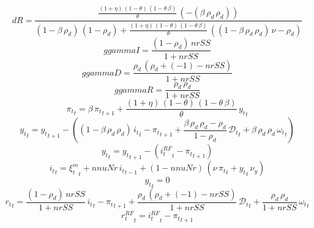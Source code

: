 \begin{dmath*}
dR = \frac{\frac{\left(1+{\eta}\right)\, \left(1-{\theta}\right)\, \left(1-{\theta}\, {\beta}\right)}{{\theta}}\, \left(-\left({\beta}\, {\rho_d}\, {\rho_d}\right)\right)}{\left(1-{\beta}\, {\rho_d}\right)\, \left(1-{\rho_d}\right)+\frac{\left(1+{\eta}\right)\, \left(1-{\theta}\right)\, \left(1-{\theta}\, {\beta}\right)}{{\theta}}\, \left(\left(1-{\beta}\, {\rho_d}\, {\rho_d}\right)\, {\nu}-{\rho_d}\right)}
\end{dmath*}
\begin{dmath*}
ggammaI = \frac{\left(1-{\rho_d}\right)\, {nrSS}}{1+{nrSS}}
\end{dmath*}
\begin{dmath*}
ggammaD = \frac{{\rho_d}\, \left({\rho_d}+\left(-1\right)-{nrSS}\right)}{1+{nrSS}}
\end{dmath*}
\begin{dmath*}
ggammaR = \frac{{\rho_d}\, {\rho_d}}{1+{nrSS}}
\end{dmath*}
\begin{dmath}
{\pi_t}_{t}={\beta}\, {\pi_t}_{t+1}+\frac{\left(1+{\eta}\right)\, \left(1-{\theta}\right)\, \left(1-{\theta}\, {\beta}\right)}{{\theta}}\, {y_t}_{t}
\end{dmath}
\begin{dmath}
{y_t}_{t}={y_t}_{t+1}-\left(\left(1-{\beta}\, {\rho_d}\, {\rho_d}\right)\, {i_t}_{t}-{\pi_t}_{t+1}+\frac{{\beta}\, {\rho_d}\, {\rho_d}-{\rho_d}}{1-{\rho_d}}\, {\mathcal{D}_t}_{t}+{\beta}\, {\rho_d}\, {\rho_d}\, {\omega_t}_{t}\right)
\end{dmath}
\begin{dmath}
{y_t}_{t}={y_t}_{t+1}-\left({i^{RF}_t}_{t}-{\pi_t}_{t+1}\right)
\end{dmath}
\begin{dmath}
{i_t}_{t}={\xi^m_t}_{t}+{nnuNr}\, {i_t}_{t-1}+\left(1-{nnuNr}\right)\, \left({\nu}\, {\pi_t}_{t}+{y_t}_{t}\, {\nu_y}\right)
\end{dmath}
\begin{dmath}
{y_t}_{t}=0
\end{dmath}
\begin{dmath}
{r_t}_{t}=\frac{\left(1-{\rho_d}\right)\, {nrSS}}{1+{nrSS}}\, {i_t}_{t}-{\pi_t}_{t+1}+\frac{{\rho_d}\, \left({\rho_d}+\left(-1\right)-{nrSS}\right)}{1+{nrSS}}\, {\mathcal{D}_t}_{t}+\frac{{\rho_d}\, {\rho_d}}{1+{nrSS}}\, {\omega_t}_{t}
\end{dmath}
\begin{dmath}
{r^{RF}_t}_{t}={i^{RF}_t}_{t}-{\pi_t}_{t+1}
\end{dmath}
